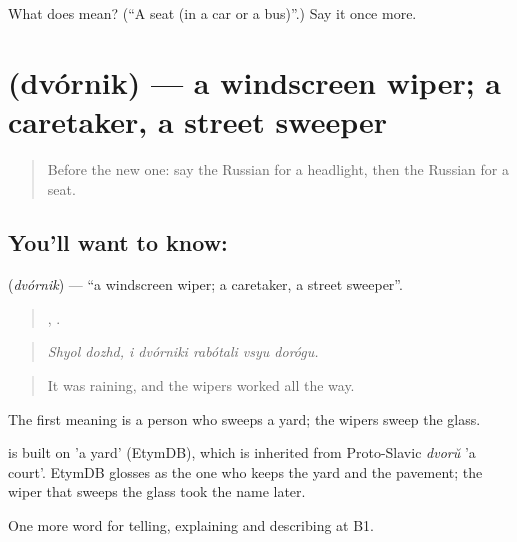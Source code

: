 \begin{tcolorbox}[breakable,colback=teal!4,colframe=teal!35!black,title={Before you move on}]
What does  mean? (\textquotedblleft{}A seat (in a car or a bus)\textquotedblright{}.) Say it once more.
\end{tcolorbox}
\section[\texorpdfstring{\ru{дворник} (dvórnik)}{дворник (dvórnik)}]{ (dvórnik) — a windscreen wiper; a caretaker, a street sweeper}

\label{lesson:RU-C406-dvornik}



\begin{quote}
Before the new one: say the Russian for a headlight, then the Russian for a seat.
\end{quote}

\subsection*{You'll want to know: }
\textbf{} (\emph{dvórnik}) — \textquotedblleft{}a windscreen wiper; a caretaker, a street sweeper\textquotedblright{}.

\begin{quote}
 ,     .
\end{quote}

\begin{quote}
\emph{Shyol dozhd, i dvórniki rabótali vsyu dorógu.}
\end{quote}

\begin{quote}
It was raining, and the wipers worked all the way.
\end{quote}

The first meaning is a person who sweeps a yard; the wipers sweep the glass.

\begin{cousinweb}
\emph{} is built on \emph{} 'a yard' (EtymDB), which is inherited from Proto-Slavic \emph{dvorŭ} 'a court'. EtymDB glosses \emph{} as the one who keeps the yard and the pavement; the wiper that sweeps the glass took the name later.
\end{cousinweb}

\begin{grammarlens}[title={What you've built}]
One more word for telling, explaining and describing at B1.
\end{grammarlens}

